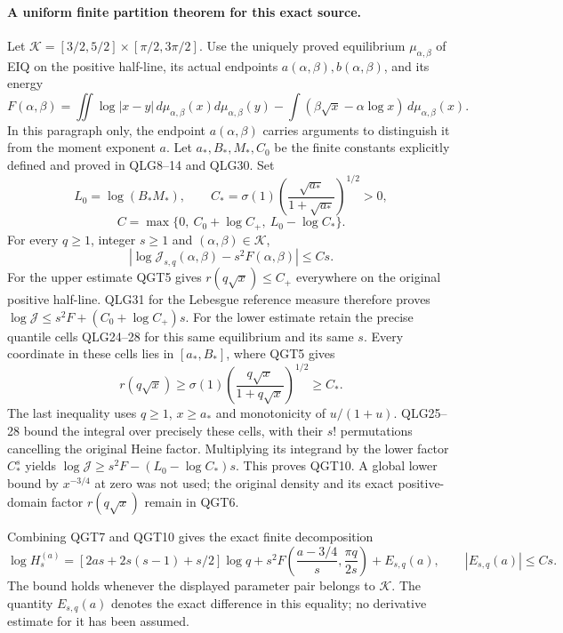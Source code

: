 \documentclass[11pt,a4paper]{article}
\begin{document}
\paragraph{A uniform finite partition theorem for this exact source.}
Let $\mathcal K=[3/2,5/2]\times[\pi/2,3\pi/2]$. Use the uniquely
proved equilibrium $\mu_{\alpha,\beta}$ of EIQ on the positive
half-line, its actual endpoints $a(\alpha,\beta),b(\alpha,\beta)$,
and its energy
\[
 F(\alpha,\beta)=\iint\log|x-y|\,d\mu_{\alpha,\beta}(x)
                    d\mu_{\alpha,\beta}(y)
       -\int(\beta\sqrt x-\alpha\log x)\,d\mu_{\alpha,\beta}(x).
 \tag{QGT8}
\]
In this paragraph only, the endpoint $a(\alpha,\beta)$ carries
arguments to distinguish it from the moment exponent $a$.
Let $a_*,B_*,M_*,C_0$ be the finite constants explicitly defined and
proved in QLG8--14 and QLG30. Set
\[
 L_0=\log(B_*M_*),\qquad
 C_* =\sigma(1)
          \left(\frac{\sqrt{a_*}}{1+\sqrt{a_*}}\right)^{1/2}>0,
\]
\[
 C=\max\{0,\ C_0+\log C_+,\ L_0-\log C_*\}.
 \tag{QGT9}
\]
For every $q\ge1$, integer $s\ge1$ and $(\alpha,\beta)\in\mathcal K$,
\[
 \boxed{\left|\log\mathcal J_{s,q}(\alpha,\beta)
                         -s^2F(\alpha,\beta)\right|\le Cs.}
 \tag{QGT10}
\]
For the upper estimate QGT5 gives $r(q\sqrt x)\le C_+$ everywhere
on the original positive half-line. QLG31 for the Lebesgue reference
measure therefore proves
$\log\mathcal J\le s^2F+(C_0+\log C_+)s$.
For the lower estimate retain the precise quantile cells QLG24--28
for this same equilibrium and its same $s$. Every coordinate in
these cells lies in $[a_*,B_*]$, where QGT5 gives
\[
 r(q\sqrt x)\ge\sigma(1)
      \left(\frac{q\sqrt x}{1+q\sqrt x}\right)^{1/2}\ge C_*.
\]
The last inequality uses $q\ge1$, $x\ge a_*$ and monotonicity of
$u/(1+u)$. QLG25--28 bound the integral over precisely these cells,
with their $s!$ permutations cancelling the original Heine factor.
Multiplying its integrand by the lower factor $C_*^s$ yields
$\log\mathcal J\ge s^2F-(L_0-\log C_*)s$.
This proves QGT10. A global lower bound by $x^{-3/4}$ at zero was
not used; the original density and its exact positive-domain factor
$r(q\sqrt x)$ remain in QGT6.

Combining QGT7 and QGT10 gives the exact finite decomposition
\[
 \boxed{\log H_s^{(a)}=
 [2as+2s(s-1)+s/2]\log q
 +s^2F\left(\frac{a-3/4}{s},\frac{\pi q}{2s}\right)+E_{s,q}(a),
 \qquad |E_{s,q}(a)|\le Cs.}
 \tag{QGT11}
\]
The bound holds whenever the displayed parameter pair belongs to
$\mathcal K$. The quantity $E_{s,q}(a)$ denotes the exact difference
in this equality; no derivative estimate for it has been assumed.
\end{document}

